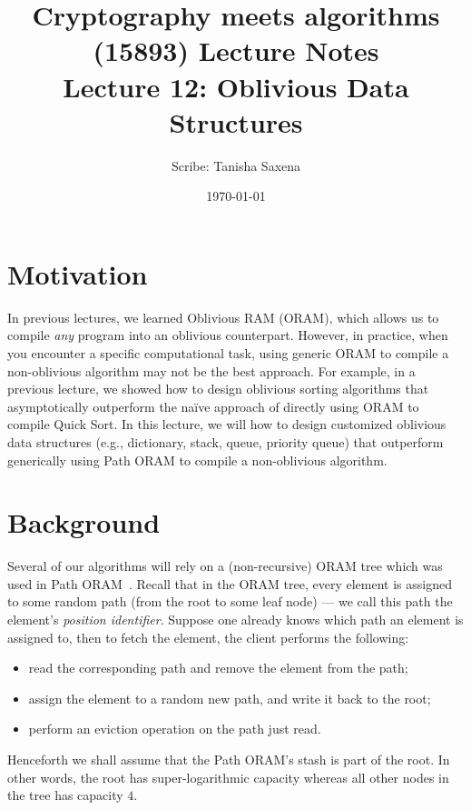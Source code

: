 \documentclass[11pt]{article}
\title{{\Large Cryptography meets algorithms (15893) Lecture Notes}\\[5pt]
{\bf Lecture 12: Oblivious Data Structures}}
\author{Scribe: Tanisha Saxena}
\date{\today}
\begin{document}
\maketitle

\section{Motivation}
In previous lectures, we learned Oblivious RAM (ORAM),
which allows us to 
compile {\it any} program into an oblivious counterpart. 
However, in practice, when you encounter
a specific computational task, using generic ORAM  
to compile a non-oblivious algorithm may not 
be the best approach. 
For example, in a previous lecture, 
we showed how to design oblivious  
sorting algorithms that asymptotically outperform
the na\"ive approach of directly using ORAM
to compile Quick Sort. 
In this lecture, we will how to design
customized oblivious data structures 
(e.g., dictionary, stack, queue, priority queue) 
that outperform 
generically using Path ORAM to compile a non-oblivious algorithm.



\section{Background}
Several of our algorithms will rely on a (non-recursive) ORAM tree
 which was used in Path ORAM~\cite{stefanov2018path}.  
Recall that in the ORAM tree, every element is assigned
to some random path (from the root to some leaf node) --- 
we call this path the  
element's {\it position identifier}.
Suppose one already knows which path an element 
is assigned to, then to fetch the element,
the client performs the following:
\begin{itemize}
\item 
read the corresponding path  
and remove the element 
from the path;
\item 
assign the element to a random new path,
and write it back to the root;
\item 
perform an eviction operation 
on the path just read. 
\end{itemize}
Henceforth
we shall assume that the Path ORAM's stash is part of the root.
In other words, the root has super-logarithmic capacity
whereas all other nodes 
in the tree has capacity $4$.
\end{document}
